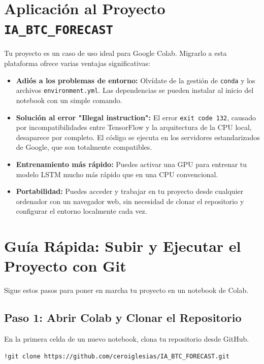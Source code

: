 \documentclass[12pt, a4paper]{article}
\begin{document}
\section{Aplicación al Proyecto \texttt{IA\_BTC\_FORECAST}}

Tu proyecto es un caso de uso ideal para Google Colab. Migrarlo a esta plataforma ofrece varias ventajas significativas:

\begin{itemize}
    \item \textbf{Adiós a los problemas de entorno:} Olvídate de la gestión de \texttt{conda} y los archivos \texttt{environment.yml}. Las dependencias se pueden instalar al inicio del notebook con un simple comando.
    
    \item \textbf{Solución al error "Illegal instruction":} El error \texttt{exit code 132}, causado por incompatibilidades entre TensorFlow y la arquitectura de la CPU local, desaparece por completo. El código se ejecuta en los servidores estandarizados de Google, que son totalmente compatibles.
    
    \item \textbf{Entrenamiento más rápido:} Puedes activar una GPU para entrenar tu modelo LSTM mucho más rápido que en una CPU convencional.
    
    \item \textbf{Portabilidad:} Puedes acceder y trabajar en tu proyecto desde cualquier ordenador con un navegador web, sin necesidad de clonar el repositorio y configurar el entorno localmente cada vez.
\end{itemize}

\section{Guía Rápida: Subir y Ejecutar el Proyecto con Git}

Sigue estos pasos para poner en marcha tu proyecto en un notebook de Colab.

\subsection{Paso 1: Abrir Colab y Clonar el Repositorio}
En la primera celda de un nuevo notebook, clona tu repositorio desde GitHub.

\begin{lstlisting}[language=bash]
!git clone https://github.com/ceroiglesias/IA_BTC_FORECAST.git
\end{lstlisting}
\end{document}
